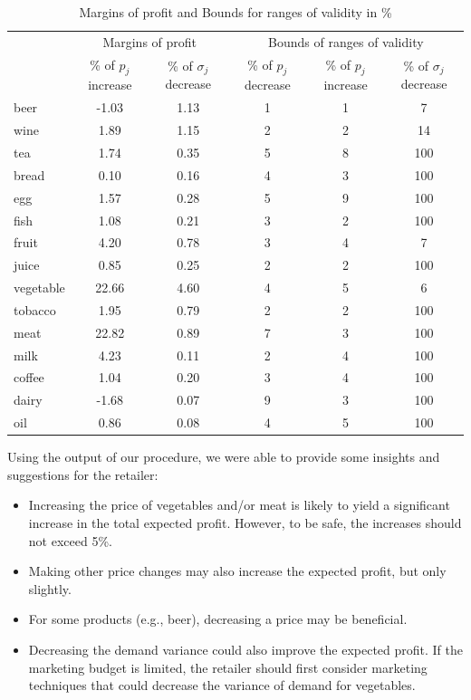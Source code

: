 \documentclass[a4paper,11pt]{article}
\begin{document}
\begin{table}[htb]
\centering
\caption{Margins of profit and Bounds for ranges of validity in \%}
\label{tab:real_sum}
\resizebox{\linewidth}{!}
{
\begin{tabular}{lcc ccc}
\toprule
& \multicolumn{2}{c}{Margins of profit} & \multicolumn{3}{c}{Bounds of ranges of validity\footnotemark[1]}\\
\cmidrule(lr){2-3} \cmidrule(lr){4-6}
& \% of $p_j$ increase 
& \% of $\sigma_j$ decrease
& \% of $p_j$ decrease
& \% of $p_j$ increase
& \% of $\sigma_j$ decrease\\
\midrule
beer & -1.03 & 1.13 & 1 & 1 & 7\\
wine & 1.89 & 1.15 & 2 & 2 & 14\\
tea & 1.74 & 0.35 & 5 & 8 & 100\\
bread & 0.10 & 0.16 & 4 & 3 & 100\\
egg & 1.57 & 0.28 & 5 & 9 & 100\\
fish & 1.08 & 0.21 & 3 & 2 & 100\\
fruit & 4.20 & 0.78 & 3 & 4 & 7\\
juice & 0.85 & 0.25 & 2 & 2 & 100\\
vegetable & 22.66 & 4.60 & 4 & 5 & 6\\
tobacco & 1.95 & 0.79 & 2 & 2 & 100\\
meat & 22.82 & 0.89 & 7 & 3 & 100\\
milk & 4.23 & 0.11 & 2 & 4 & 100\\
coffee & 1.04 & 0.20 & 3 & 4 & 100\\
dairy & -1.68 & 0.07 & 9 & 3 & 100\\
oil & 0.86 & 0.08 & 4 & 5 & 100
\\
\bottomrule
\end{tabular}}
\end{table}

Using the output of our procedure, we were able to provide some insights and suggestions for the retailer:
\begin{itemize}
\item Increasing the price of vegetables and/or meat is likely to yield a significant increase in the total expected profit. However, to be safe, the increases should not exceed 5\%.
\item Making other price changes may also increase the expected profit, but only slightly.
\item For some products (e.g., beer), decreasing a price may be beneficial.
\item Decreasing the demand variance could also improve the expected profit. If the marketing budget is limited, the retailer should first consider marketing techniques that could decrease the variance of demand for vegetables.
\end{itemize}
\end{document}
